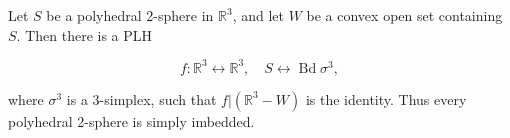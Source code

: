 Let $S$ be a polyhedral 2-sphere in $\mathbb{R}^3$, and let $W$ be a convex open set containing $S$. Then there is a PLH

$$f: \mathbb{R}^3 \leftrightarrow \mathbb{R}^3, \quad S \leftrightarrow \operatorname{Bd} \sigma^3,$$

where $\sigma^3$ is a 3-simplex, such that $f|(\mathbb{R}^3 - W)$ is the identity. Thus every polyhedral 2-sphere is simply imbedded.
